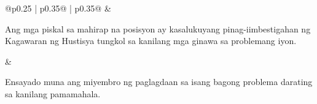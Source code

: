 \begin{table}[!ht]
\begin{tabular}{@{}p{0.25\textwidth} | p{0.35\textwidth}@{} | p{0.35\textwidth}@{}}
 & 
\begin{minipage}[t]{\linewidth}%
\raggedright
{\footnotesize 
Ang mga piskal sa mahirap na posisyon ay kasalukuyang pinag-iimbestigahan ng Kagawaran ng Hustisya tungkol sa kanilang mga ginawa sa problemang iyon.
}
\end{minipage}
& 
\begin{minipage}[t]{\linewidth}%
\raggedright
{\footnotesize Ensayado muna ang miyembro ng paglagdaan sa isang bagong problema darating sa kanilang pamamahala.
}
\end{minipage} \\
\bottomrule
\end{tabular}
\vspace{-0.3cm}
\end{table}




